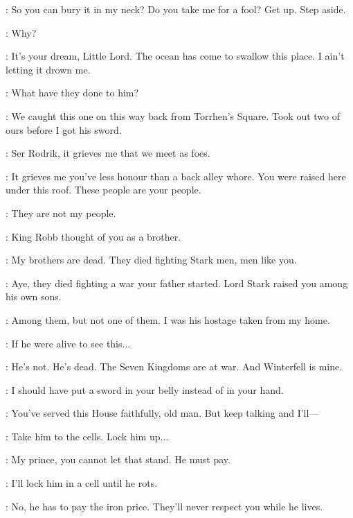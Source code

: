 \THEON: So you can bury it in my neck? Do you take me for a fool? Get up. Step aside. 


\BRAN:  Why? 

\OSHA:  It's your dream, Little Lord. The ocean has come to swallow this place. I ain't letting it drown me. 


\BRAN: What have they done to him? 

\LORREN: We caught this one on this way back from Torrhen's Square. Took out two of ours before I got his sword. 

\THEON: Ser Rodrik, it grieves me that we meet as foes. 

\RODRIK: It grieves me you've less honour than a back alley whore. You were raised here under this roof. These people are your people. 

\THEON: They are not my people. 

\RODRIK: King Robb thought of you as a brother. 

\THEON: My brothers are dead. They died fighting Stark men, men like you. 

\RODRIK: Aye, they died fighting a war your father started. Lord Stark raised you among his own sons. 

\THEON: Among them, but not one of them. I was his hostage taken from my home. 

\RODRIK: If he were alive to see this$\ldots$ 

\THEON: He's not. He's dead. The Seven Kingdoms are at war. And Winterfell is mine. 

\RODRIK: I should have put a sword in your belly instead of in your hand. 

\THEON: You've served this House faithfully, old man. But keep talking and I'll--- 


\THEON: Take him to the cells. Lock him up$\ldots$ 

\DAGMER: My prince, you cannot let that stand. He must pay. 

\THEON: I'll lock him in a cell until he rots. 

\DAGMER: No, he has to pay the iron price. They'll never respect you while he lives. 

